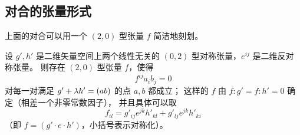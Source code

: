 \subsection{对合的张量形式}

上面的对合可以用一个 $(2,0)$ 型张量 $f$ 简洁地刻划。

\begin{proposition}[对合张量]\label{prop:involution-tensor}
设 $g',h'$ 是二维矢量空间上两个线性无关的 $(0,2)$ 型对称张量，$e^{ij}$ 是二维反对称张量。
则存在 $(2,0)$ 型张量 $f$，使得
\[
f^{ij}a_ib_j=0
\]
对每一对满足 $g'+\lambda h'=(ab)$ 的点 $a,b$ 都成立；
这样的 $f$ 由 $f:g'=f:h'=0$ 确定（相差一个非零常数因子），
并且具体可以取
\[
f_{il}=g'_{ij}e^{jk}h'_{kl}+g'_{lj}e^{jk}h'_{ki}
\]
（即 $f=(g'\cdot e\cdot h')$，小括号表示对称化）。
\end{proposition}

